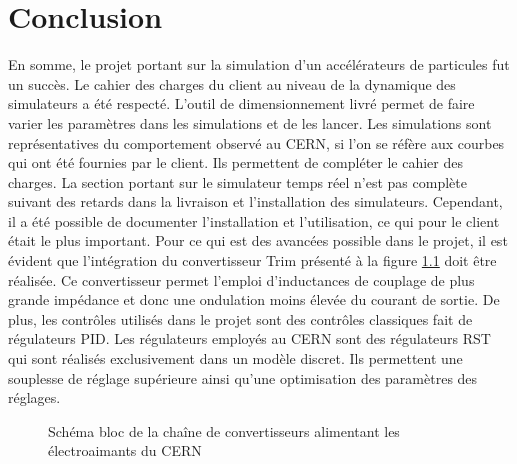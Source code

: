 \chapter{Conclusion}
En somme, le projet portant sur la simulation d'un accélérateurs de particules fut un succès. Le cahier des charges du client au niveau de la dynamique des simulateurs a été respecté. L'outil de dimensionnement livré permet de faire varier les paramètres dans les simulations et de les lancer. Les simulations sont représentatives du comportement observé au CERN, si l'on se réfère aux courbes qui ont été fournies par le client. Ils permettent de compléter le cahier des charges. La section portant sur le simulateur temps réel n'est pas complète suivant des retards dans la livraison et l'installation des simulateurs. Cependant, il a été possible de documenter l'installation et l'utilisation, ce qui pour le client était le plus important. Pour ce qui est des avancées possible dans le projet, il est évident que l'intégration du convertisseur \og Trim \fg{} présenté à la figure \ref{conv_CERN} doit être réalisée. Ce convertisseur permet l'emploi d'inductances de couplage de plus grande impédance et donc une ondulation moins élevée du courant de sortie. De plus, les contrôles utilisés dans le projet sont des contrôles classiques fait de régulateurs PID. Les régulateurs employés au CERN sont des régulateurs RST qui sont réalisés exclusivement dans un modèle discret. Ils permettent une souplesse de réglage supérieure ainsi qu'une optimisation des paramètres des réglages.


\begin{figure}[htb]
\centering
{}
\caption{Schéma bloc de la chaîne de convertisseurs alimentant les électroaimants du CERN}
\label{conv_CERN}
\end{figure}
